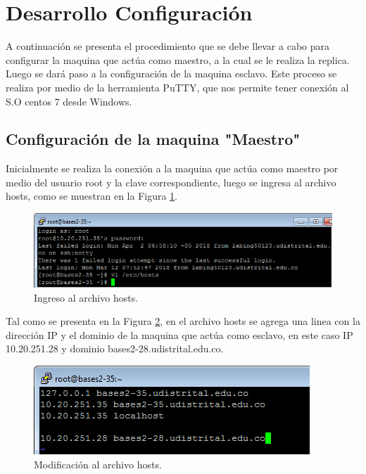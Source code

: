 \section{Desarrollo Configuración}


A continuación se presenta el procedimiento que se debe llevar a cabo para configurar la maquina que actúa como maestro, a la cual se le realiza la replica. Luego se dará paso a la configuración de la maquina esclavo. Este proceso se realiza por medio de la herramienta PuTTY, que nos permite tener conexión al S.O centos 7 desde Windows.\\

\subsection*{Configuración de la maquina "Maestro"}
Inicialmente se realiza la conexión a la maquina que actúa como maestro por medio del usuario root y la clave correspondiente, luego se ingresa al archivo hosts, como se muestran en la Figura \ref{fig:1}.

\begin{figure}[H]
\centering
\includegraphics[width=\columnwidth]{eRelatedWorks/src/1}
\caption{Ingreso al archivo hosts. }\label{fig:1}
\end{figure}

Tal como se presenta en la Figura \ref{fig:2}, en el archivo hosts se agrega una linea con la dirección IP y el dominio de la maquina que actúa como esclavo, en este caso IP 10.20.251.28 y dominio bases2-28.udistrital.edu.co.

\begin{figure}[H]
\centering
\includegraphics[width=\columnwidth]{eRelatedWorks/src/2}
\caption{Modificación al archivo hosts. }\label{fig:2}
\end{figure}

